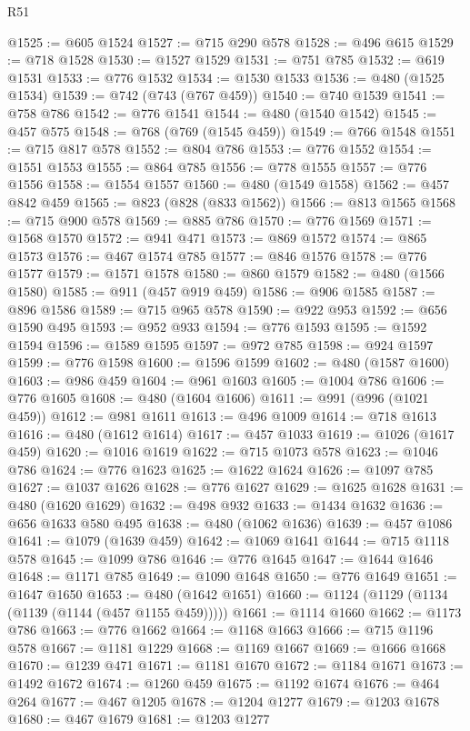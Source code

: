 \begin{lexlean}{R51}
\begin{coremodule}
@1525 := @605 @1524
@1527 := @715 @290 @578
@1528 := @496 @615
@1529 := @718 @1528
@1530 := @1527 @1529
@1531 := @751 @785
@1532 := @619 @1531
@1533 := @776 @1532
@1534 := @1530 @1533
@1536 := @480 (@1525 @1534)
@1539 := @742 (@743 (@767 @459))
@1540 := @740 @1539
@1541 := @758 @786
@1542 := @776 @1541
@1544 := @480 (@1540 @1542)
@1545 := @457 @575
@1548 := @768 (@769 (@1545 @459))
@1549 := @766 @1548
@1551 := @715 @817 @578
@1552 := @804 @786
@1553 := @776 @1552
@1554 := @1551 @1553
@1555 := @864 @785
@1556 := @778 @1555
@1557 := @776 @1556
@1558 := @1554 @1557
@1560 := @480 (@1549 @1558)
@1562 := @457 @842 @459
@1565 := @823 (@828 (@833 @1562))
@1566 := @813 @1565
@1568 := @715 @900 @578
@1569 := @885 @786
@1570 := @776 @1569
@1571 := @1568 @1570
@1572 := @941 @471
@1573 := @869 @1572
@1574 := @865 @1573
@1576 := @467 @1574 @785
@1577 := @846 @1576
@1578 := @776 @1577
@1579 := @1571 @1578
@1580 := @860 @1579
@1582 := @480 (@1566 @1580)
@1585 := @911 (@457 @919 @459)
@1586 := @906 @1585
@1587 := @896 @1586
@1589 := @715 @965 @578
@1590 := @922 @953
@1592 := @656 @1590 @495
@1593 := @952 @933
@1594 := @776 @1593
@1595 := @1592 @1594
@1596 := @1589 @1595
@1597 := @972 @785
@1598 := @924 @1597
@1599 := @776 @1598
@1600 := @1596 @1599
@1602 := @480 (@1587 @1600)
@1603 := @986 @459
@1604 := @961 @1603
@1605 := @1004 @786
@1606 := @776 @1605
@1608 := @480 (@1604 @1606)
@1611 := @991 (@996 (@1021 @459))
@1612 := @981 @1611
@1613 := @496 @1009
@1614 := @718 @1613
@1616 := @480 (@1612 @1614)
@1617 := @457 @1033
@1619 := @1026 (@1617 @459)
@1620 := @1016 @1619
@1622 := @715 @1073 @578
@1623 := @1046 @786
@1624 := @776 @1623
@1625 := @1622 @1624
@1626 := @1097 @785
@1627 := @1037 @1626
@1628 := @776 @1627
@1629 := @1625 @1628
@1631 := @480 (@1620 @1629)
@1632 := @498 @932
@1633 := @1434 @1632
@1636 := @656 @1633 @580 @495
@1638 := @480 (@1062 @1636)
@1639 := @457 @1086
@1641 := @1079 (@1639 @459)
@1642 := @1069 @1641
@1644 := @715 @1118 @578
@1645 := @1099 @786
@1646 := @776 @1645
@1647 := @1644 @1646
@1648 := @1171 @785
@1649 := @1090 @1648
@1650 := @776 @1649
@1651 := @1647 @1650
@1653 := @480 (@1642 @1651)
@1660 := @1124 (@1129 (@1134 (@1139 (@1144 (@457 @1155 @459)))))
@1661 := @1114 @1660
@1662 := @1173 @786
@1663 := @776 @1662
@1664 := @1168 @1663
@1666 := @715 @1196 @578
@1667 := @1181 @1229
@1668 := @1169 @1667
@1669 := @1666 @1668
@1670 := @1239 @471
@1671 := @1181 @1670
@1672 := @1184 @1671
@1673 := @1492 @1672
@1674 := @1260 @459
@1675 := @1192 @1674
@1676 := @464 @264
@1677 := @467 @1205
@1678 := @1204 @1277
@1679 := @1203 @1678
@1680 := @467 @1679
@1681 := @1203 @1277

\end{coremodule}
\end{lexlean}
